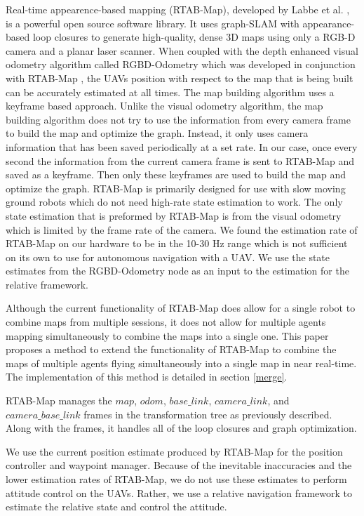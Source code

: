 \documentclass[letterpaper, 10 pt, conference]{ieeeconf}  %
\begin{document}
Real-time appearence-based mapping (RTAB-Map), developed by Labbe et al. \cite{Labbe2011}\cite{Labbe2013}\cite{Labbe2019}, is a powerful open source software library. It uses graph-SLAM with appearance-based loop closures to generate high-quality, dense 3D maps using only a RGB-D camera and a planar laser scanner. When coupled with the depth enhanced visual odometry algorithm called RGBD-Odometry which was developed in conjunction with RTAB-Map \cite{Labbe2019}, the UAVs position with respect to the map that is being built can be accurately estimated at all times. The map building algorithm uses a keyframe based approach. Unlike the visual odometry algorithm, the map building algorithm does not try to use the information from every camera frame to build the map and optimize the graph. Instead, it only uses camera information that has been saved periodically at a set rate. In our case, once every second the information from the current camera frame is sent to RTAB-Map and saved as a keyframe. Then only these keyframes are used to build the map and optimize the graph. RTAB-Map is primarily designed for use with slow moving ground robots which do not need high-rate state estimation to work. The only state estimation that is preformed by RTAB-Map is from the visual odometry which is limited by the frame rate of the camera. We found the estimation rate of RTAB-Map on our hardware to be in the 10-30 Hz range which is not sufficient on its own to use for autonomous navigation with a UAV. We use the state estimates from the RGBD-Odometry node as an input to the estimation for the relative framework.

Although the current functionality of RTAB-Map does allow for a single robot to combine maps from multiple sessions, it does not allow for multiple agents mapping simultaneously to combine the maps into a single one. This paper proposes a method to extend the functionality of RTAB-Map to combine the maps of multiple agents flying simultaneously into a single map in near real-time. The implementation of this method is detailed in section \ref{merge}.

RTAB-Map manages the $\mathit{map}$, $\mathit{odom}$, $\mathit{base\_link}$, $\mathit{camera\_link}$, and $\mathit{camera\_base\_link}$ frames in the transformation tree as previously described. Along with the frames, it handles all of the loop closures and graph optimization.

We use the current position estimate produced by RTAB-Map for the position controller and waypoint manager. Because of the inevitable inaccuracies and the lower estimation rates of RTAB-Map, we do not use these estimates to perform attitude control on the UAVs. Rather, we use a relative navigation framework to estimate the relative state and control the attitude.
\end{document}
